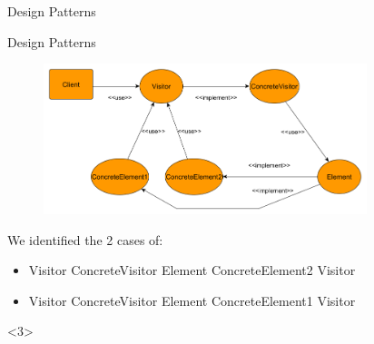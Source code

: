 \documentclass{beamer}
\theoremstyle{definition}
\begin{document}
\begin{section}{Design Patterns}
\begin{subsection}{Design Patterns}
\begin{frame}
{\begin{figure}[!h]
	\centering
	\includegraphics[width=0.84\textwidth]{./Visitor/ClassDependencyGraph.png}
	\label{Videpengraph}
\end{figure}
We identified the 2 cases of:
\begin{itemize}
	\item Visitor ConcreteVisitor Element ConcreteElement2 Visitor
	\item Visitor ConcreteVisitor Element ConcreteElement1 Visitor	
\end{itemize}}<3>
	\end{frame}
\end{subsection}
\end{section}
\end{document}
